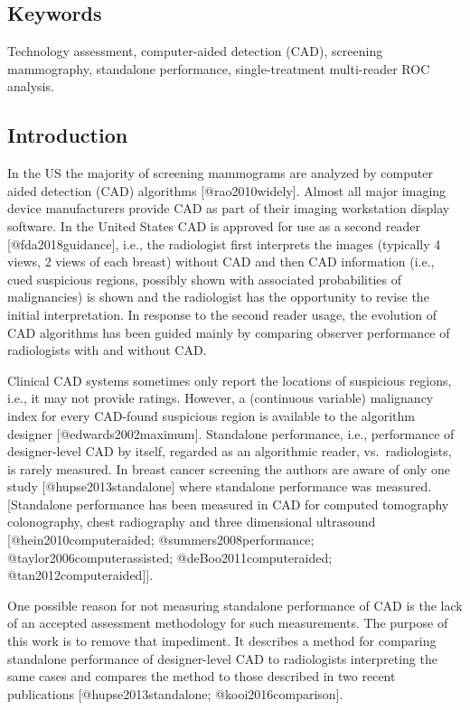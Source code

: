 \documentclass[
]{article}
\begin{document}
\hypertarget{standalone-cad-radiologists-ker-words}{%
\subsection{Keywords}\label{standalone-cad-radiologists-ker-words}}

Technology assessment, computer-aided detection (CAD), screening mammography, standalone performance, single-treatment multi-reader ROC analysis.

\hypertarget{standalone-cad-radiologists-introduction}{%
\subsection{Introduction}\label{standalone-cad-radiologists-introduction}}

In the US the majority of screening mammograms are analyzed by computer aided detection (CAD) algorithms {[}@rao2010widely{]}. Almost all major imaging device manufacturers provide CAD as part of their imaging workstation display software. In the United States CAD is approved for use as a second reader {[}@fda2018guidance{]}, i.e., the radiologist first interprets the images (typically 4 views, 2 views of each breast) without CAD and then CAD information (i.e., cued suspicious regions, possibly shown with associated probabilities of malignancies) is shown and the radiologist has the opportunity to revise the initial interpretation. In response to the second reader usage, the evolution of CAD algorithms has been guided mainly by comparing observer performance of radiologists with and without CAD.

Clinical CAD systems sometimes only report the locations of suspicious regions, i.e., it may not provide ratings. However, a (continuous variable) malignancy index for every CAD-found suspicious region is available to the algorithm designer {[}@edwards2002maximum{]}. Standalone performance, i.e., performance of designer-level CAD by itself, regarded as an algorithmic reader, vs.~radiologists, is rarely measured. In breast cancer screening the authors are aware of only one study {[}@hupse2013standalone{]} where standalone performance was measured. {[}Standalone performance has been measured in CAD for computed tomography colonography, chest radiography and three dimensional ultrasound {[}@hein2010computeraided; @summers2008performance; @taylor2006computerassisted; @deBoo2011computeraided; @tan2012computeraided{]}{]}.

One possible reason for not measuring standalone performance of CAD is the lack of an accepted assessment methodology for such measurements. The purpose of this work is to remove that impediment.
It describes a method for comparing standalone performance of designer-level CAD to radiologists interpreting the same cases and compares the method to those described in two recent publications {[}@hupse2013standalone; @kooi2016comparison{]}.
\end{document}
